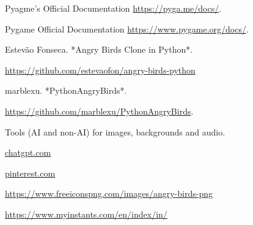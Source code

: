 \documentclass{article}
\begin{document}
\begin{thebibliography}{9}
    Pyagme's Official Documentation
    \url{https://pyga.me/docs/}.

    Pygame Official Documentation
    \url{https://www.pygame.org/docs/}.

    Estevão Fonseca. *Angry Birds Clone in Python*. 
        
    \url{https://github.com/estevaofon/angry-birds-python}

    marblexu. *PythonAngryBirds*.

    \url{https://github.com/marblexu/PythonAngryBirds}.


    Tools (AI and non-AI) for images, backgrounds and audio.

    \url{chatgpt.com}

    \url{pinterest.com}

    \url{https://www.freeiconspng.com/images/angry-birds-png}

    \url{https://www.myinstants.com/en/index/in/}
\end{thebibliography}
\end{document}
